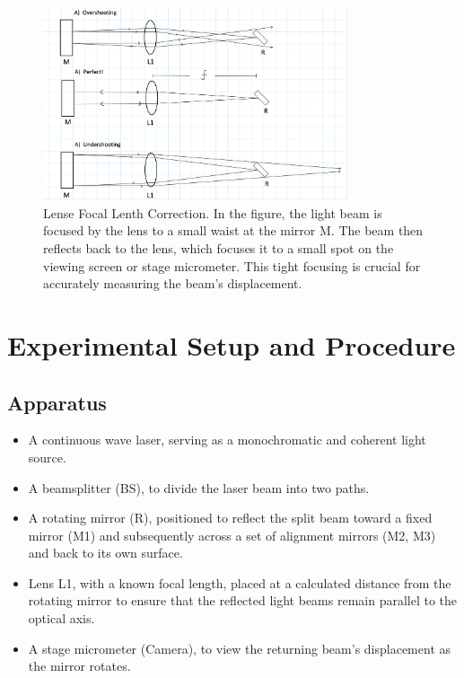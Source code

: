 \documentclass[12pt]{article}
\begin{document}
        \begin{figure}[!h]
                \centering
                \includegraphics[width=0.80\textwidth]{../Imgs/len_corr.png}
                \caption{Lense Focal Lenth Correction. In the figure, the light beam is focused by the lens
                to a small waist at the mirror M. The beam then reflects back to the lens, which focuses it
                to a small spot on the viewing screen or stage micrometer. This tight focusing is crucial for
                accurately measuring the beam's displacement.}
                \label{fig: Lense Focal Lenth Correction}
        \end{figure}

        \newpage


\section{Experimental Setup and Procedure}
        \subsection{Apparatus}
        \begin{itemize}
                \item A continuous wave laser, serving as a monochromatic and coherent light source.
                \item A beamsplitter (BS), to divide the laser beam into two paths.
                \item A rotating mirror (R), positioned to reflect the split beam toward a fixed mirror (M1) and subsequently across a set of alignment mirrors (M2, M3) and back to its own surface.
                \item Lens L1, with a known focal length, placed at a calculated distance from the rotating mirror to ensure that the reflected light beams remain parallel to the optical axis.
                \item A stage micrometer (Camera), to view the returning beam’s displacement as the mirror rotates.
        \end{itemize}
\end{document}
